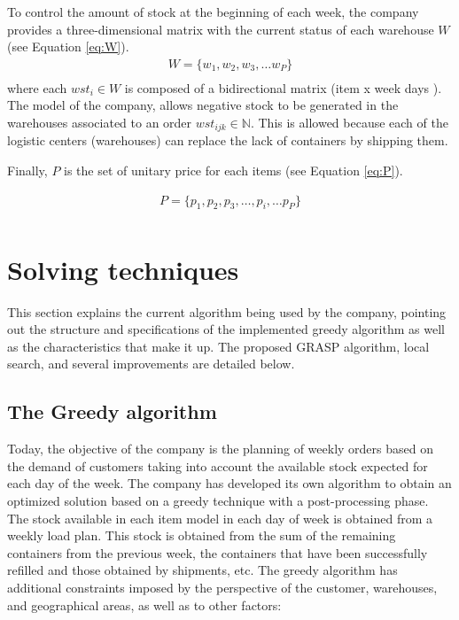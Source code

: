 \documentclass[letterpaper]{article} %
\begin{document}
To control the amount of stock at the beginning of each week, the company provides a three-dimensional matrix with the current status of each warehouse $W$ (see Equation \ref{eq:W}).
\begin{equation}
    \begin{aligned}\label{eq:W}
        W = \{w_1, w_2, w_3, \dots w_P \}\\
    \end{aligned}
\end{equation}
where each $wst_i \in W$ is composed of a bidirectional matrix (item x week days ). The model of the company, allows negative stock to be generated in the warehouses associated to an order $wst_{ijk} \in \mathbb{N} $. This is allowed because each of the logistic centers (warehouses) can replace the lack of containers by shipping them.

Finally, $P$ is the set of unitary price for each items (see Equation \ref{eq:P}).

\begin{equation}
    \begin{aligned}\label{eq:P}
        P = \{p_1, p_2, p_3, \dots, p_i, \dots p_P \}\\
    \end{aligned}
\end{equation}


\section*{Solving techniques}

This section explains the current algorithm being used by the company, pointing out the structure and specifications of the implemented greedy algorithm as well as the characteristics that make it up. The proposed GRASP algorithm, local search, and several improvements are detailed below.

\subsection*{The Greedy algorithm }
Today, the objective of the company is the planning of weekly orders based on the demand of customers taking into account the available stock expected for each day of the week. The company has developed its own algorithm to obtain an optimized solution based on a greedy technique with a post-processing phase.
The stock available in each item model in each day of week is obtained from a weekly load plan. This stock is obtained from the sum of the remaining containers from the previous week, the containers that have been successfully refilled and those obtained by shipments, etc. The greedy algorithm has additional constraints imposed by the perspective of the customer, warehouses, and geographical areas, as well as to other factors:
\end{document}
